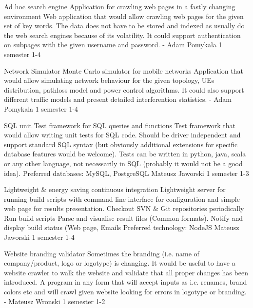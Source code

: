 \begin{project}
{Ad hoc search engine}
{Application for crawling web pages in a fastly changing environment} 
{ 
Web application that would allow crawling web pages for the given set of
key words. The data does not have to be stored and indexed as usually do the web
search engines because of its volatility. It could support authentication on
subpages with the given username and password.
}
{-}
{Adam Pomykala}
{1 semester}
{1-4}
\end{project}
\begin{project}
{Network Simulator}
{Monte Carlo simulator for mobile networks} 
{ 
Application that would allow simulating network behaviour for the given
topology, UEs distribution, pathloss model and power control algorithms. It
could also support different traffic models and present detailed interferention
statistics.
} 
{-}
{Adam Pomykala}
{1 semester}
{1-4}
\end{project}
\begin{project}
{SQL unit}
{Test framework for SQL queries and functions} 
{ 
Test framework that would allow writing unit tests for SQL code. Should be
driver independent and support standard SQL syntax (but obviously additional
extensions for specific database features would be welcome). Tests can be
written in python, java, scala or any other language, not necessarily in SQL
(probably it would not be a good idea).
}
{Preferred databases: MySQL, PostgreSQL}
{Mateusz Jaworski}
{1 semester}
{1-3}
\end{project}
\begin{project}
{Lightweight \& energy saving continuous integration}
{Lightweight server for running build scripts with command line interface for configuration and simple web page for results presentation.} 
{ 
Checkout SVN \& Git repositories periodically Run build scripts Parse and
visualise result files (Common formats). Notify and display build status (Web page, Emails }
{Preferred technology: NodeJS}
{Mateusz Jaworski}
{1 semester}
{1-4}
\end{project}
\begin{project}
{Website branding validator}
{Sometimes the branding (i.e. name of company/product, logo or logotype) is changing. It would be useful to have a website crawler to walk the website and validate that all proper changes has been introduced.} 
{
A program in any form that will accept inputs as i.e. renames, brand colors etc and will crawl given website looking for errors in logotype or branding.
}
{-}
{Mateusz Wronski}
{1 semester}
{1-2}
\end{project}
